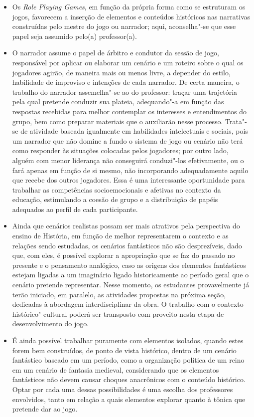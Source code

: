 \documentclass{extarticle}
\begin{document}
\begin{itemize}
\item
  Os \emph{Role Playing Games}, em função da própria forma como se
  estruturam os jogos, favorecem a inserção de elementos e conteúdos
  históricos nas narrativas construídas pelo mestre do jogo ou narrador;
  aqui, aconselha"-se que esse papel seja assumido pelo(a) professor(a).
\item
  O narrador assume o papel de árbitro e condutor da sessão de jogo,
  responsável por aplicar ou elaborar um cenário e um roteiro sobre o
  qual os jogadores agirão, de maneira mais ou menos livre, a depender
  do estilo, habilidade de improviso e intenções de cada narrador. De
  certa maneira, o trabalho do narrador assemelha"-se ao do professor:
  traçar uma trajetória pela qual pretende conduzir sua plateia,
  adequando"-a em função das respostas recebidas para melhor contemplar
  os interesses e entendimentos do grupo, bem como preparar materiais
  que o auxiliarão nesse processo. Trata"-se de atividade baseada
  igualmente em habilidades intelectuais e sociais, pois um narrador que
  não domine a fundo o sistema de jogo ou cenário não terá como
  responder às situações colocadas pelos jogadores; por outro lado,
  alguém com menor liderança não conseguirá conduzi"-los efetivamente, ou
  o fará apenas em função de si mesmo, não incorporando adequadamente
  aquilo que recebe dos outros jogadores. Essa é uma interessante
  oportunidade para trabalhar as competências socioemocionais e afetivas
  no contexto da educação, estimulando a coesão de grupo e a
  distribuição de papéis adequados ao perfil de cada participante.
\item
  Ainda que cenários realistas possam ser mais atrativos pela
  perspectiva do ensino de História, em função de melhor representarem o
  contexto e as relações sendo estudadas, os cenários fantásticos não
  são desprezíveis, dado que, com eles, é possível explorar a
  apropriação que se faz do passado no presente e o pensamento
  analógico, caso as origens dos elementos fantásticos estejam ligadas a
  um imaginário ligado historicamente ao período geral que o cenário
  pretende representar. Nesse momento, os estudantes provavelmente já
  terão iniciado, em paralelo, as atividades propostas na próxima seção,
  dedicadas à abordagem interdisciplinar da obra. O trabalho com o
  contexto histórico"-cultural poderá ser transposto com proveito nesta
  etapa de desenvolvimento do jogo.
\item
  É ainda possível trabalhar puramente com elementos isolados, quando
  estes forem bem construídos, de ponto de vista histórico, dentro de um
  cenário fantástico baseado em um período, como a organização política
  de um reino em um cenário de fantasia medieval, considerando que os
  elementos fantásticos não devem causar choques anacrônicos com o
  conteúdo histórico. Optar por cada uma dessas possibilidades é uma
  escolha dos professores envolvidos, tanto em relação a quais elementos
  explorar quanto à tônica que pretende dar ao jogo.
\end{itemize}
\end{document}
